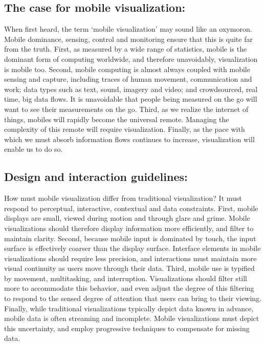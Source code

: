 \documentclass{sigchi-ext}
\begin{document}
\subsection{The case for mobile visualization:} When first heard, the term `mobile visualization' may sound like an oxymoron. Mobile dominance, sensing, control and monitoring ensure that this is quite far from the truth. First, as measured by a wide range of statistics, mobile is the dominant form of computing worldwide, and therefore unavoidably, visualization is mobile too. Second, mobile computing is almost always coupled with mobile sensing and capture, including traces of human movement, communication and work; data types such as text, sound, imagery and video; and crowdsourced, real time, big data flows. It is unavoidable that people being measured on the go will want to see their measurements on the go. Third, as we realize the internet of things, mobiles will rapidly become the universal remote. Managing the complexity of this remote will require visualization. Finally, as the pace with which we must absorb information flows continues to increase, visualization will enable us to do so.

\subsection{Design and interaction guidelines:} How must mobile visualization differ from traditional visualization? It must respond to perceptual, interactive, contextual and data constraints. First, mobile displays are small, viewed during motion and through glare and grime. Mobile visualizations should therefore display information more efficiently, and filter to maintain clarity. Second, because mobile input is dominated by touch, the input surface is effectively coarser than the display surface. Interface elements in mobile visualizations should require less precision, and interactions must maintain more visual continuity as users move through their data. Third, mobile use is typified by movement, multitasking, and interruption. Visualizations should filter still more to accommodate this behavior, and even adjust the degree of this filtering to respond to the sensed degree of attention that users can bring to their viewing. Finally, while traditional visualizations typically depict data known in advance, mobile data is often streaming and incomplete. Mobile visualizations must depict this uncertainty, and employ progressive techniques to compensate for missing data.
\end{document}
